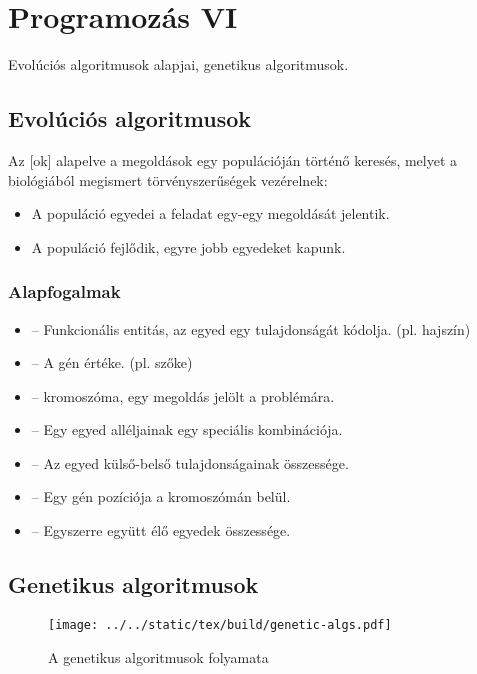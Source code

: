 \documentclass[../../main.tex]{subfiles}
\begin{document}
\section{Programozás VI}

\begin{fulltheorem}
  Evolúciós algoritmusok alapjai, genetikus algoritmusok.
\end{fulltheorem}

\subsection{Evolúciós algoritmusok}

Az [ok] alapelve a megoldások egy populációján
történő keresés, melyet a biológiából megismert törvényszerűségek vezérelnek:
\begin{itemize}
  \item A populáció egyedei a feladat egy-egy megoldását jelentik.
  \item A populáció fejlődik, egyre jobb egyedeket kapunk.
\end{itemize}

\subsubsection{Alapfogalmak}

\begin{itemize}
  \item {} -- Funkcionális entitás, az egyed egy tulajdonságát kódolja.
        (pl. hajszín)
  \item {} -- A gén értéke. (pl. szőke)
  \item {} -- kromoszóma, egy megoldás jelölt a problémára.
  \item {} -- Egy egyed alléljainak egy speciális kombinációja.
  \item {} -- Az egyed külső-belső tulajdonságainak összessége.
  \item {} -- Egy gén pozíciója a kromoszómán belül.
  \item {} -- Egyszerre együtt élő egyedek összessége.
\end{itemize}

\subsection{Genetikus algoritmusok}
\begin{figure}[H]
  \centering
  \texttt{[image: ../../static/tex/build/genetic-algs.pdf]}
  \caption{A genetikus algoritmusok folyamata}
  \label{fig:genalg}
\end{figure}
\end{document}
